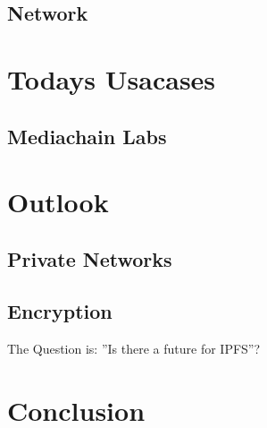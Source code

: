 \documentclass[a4paper,11pt, oneside]{report}
\theoremstyle{definition}
\begin{document}
\section{Network}

\chapter{Todays Usacases}
\section{Mediachain Labs}


\chapter{Outlook}
\section{Private Networks}
\section{Encryption}

The Question is: ''Is there a future for IPFS''?

\chapter{Conclusion}

\end{document}

